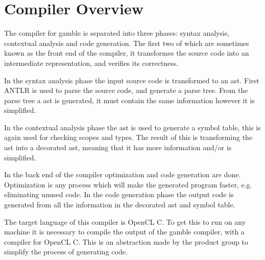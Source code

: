 \chapter{Compiler Overview}

The compiler for \gls{gamble} is separated into three phases: syntax analysis, contextual analysis and code generation.
The first two of which are sometimes known as the front end of the compiler, it transformes the source code into an intermediate representation, and verifies its correctness. 

In the syntax analysis phase the input source code is transformed to an \acrfull{ast}. 
First ANTLR is used to parse the source code, and generate a parse tree.
From the parse tree a \acrshort{ast} is generated, it must contain the same information however it is simplified. 

In the contextual analysis phase the \acrshort{ast} is used to generate a symbol table, this is again used for checking scopes and types. 
The result of this is transforming the \acrshort{ast} into a decorated \acrshort{ast}, meaning that it has more information and/or is simplified. 

In the back end of the compiler optimization and code generation are done.
Optimization is any process which will make the generated program faster, e.g. eliminating unused code. 
In the code generation phase the output code is generated from all the information in the decorated \acrshort{ast} and symbol table.

The target language of this compiler is OpenCL C.
To get this to run on any machine it is necessary to compile the output of the \gls{gamble} compiler, with a compiler for OpenCL C.
This is an abstraction made by the product group to simplify the process of generating code.  


